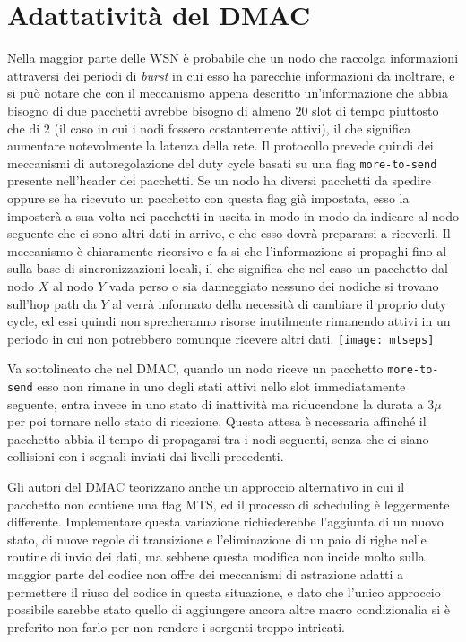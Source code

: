 \documentclass[twoside,11pt,a4paper,italian,openany]{book}
\begin{document}
\section{Adattatività del DMAC}
Nella maggior parte delle WSN è probabile che un nodo che raccolga informazioni attraversi dei
periodi di \emph{burst} in cui esso ha parecchie informazioni da inoltrare, e si può notare che 
con il meccanismo appena descritto un'informazione che abbia bisogno di due pacchetti avrebbe 
bisogno di almeno $20$ slot di tempo piuttosto che di $2$ (il caso in cui i nodi fossero 
costantemente attivi), il che significa aumentare notevolmente la latenza della rete. 
Il protocollo prevede quindi dei meccanismi di autoregolazione del duty cycle basati su una flag 
\texttt{more-to-send} presente nell'header dei pacchetti. 
Se un nodo ha diversi pacchetti da spedire oppure se ha ricevuto un pacchetto con questa flag
già impostata, esso la imposterà a sua volta nei pacchetti in uscita in modo in modo da 
indicare al nodo seguente che ci sono altri dati in arrivo, e che esso dovrà prepararsi a 
riceverli. Il meccanismo è chiaramente ricorsivo e fa si che l'informazione si propaghi fino 
al \sink sulla base di sincronizzazioni locali, il che significa che nel caso un pacchetto dal 
nodo $X$ al nodo $Y$ vada perso o sia danneggiato nessuno dei nodiche si trovano sull'hop path da
$Y$ al \sink verrà informato della necessità di cambiare il proprio duty cycle, ed essi quindi 
non sprecheranno risorse inutilmente rimanendo attivi in un periodo in cui non potrebbero 
comunque ricevere altri dati. 
\texttt{[image: mtseps]}


Va sottolineato che nel DMAC, quando un nodo riceve un pacchetto \texttt{more-to-send} esso non 
rimane in uno degli stati attivi nello slot immediatamente seguente, entra invece in uno stato di
inattività ma riducendone la durata a  
$3\mu$ per poi tornare nello stato di ricezione. Questa attesa è necessaria affinché il 
pacchetto abbia il tempo di propagarsi tra i nodi seguenti, senza che ci siano collisioni con i
segnali inviati dai livelli precedenti. 

Gli autori del DMAC teorizzano anche un approccio alternativo in cui il pacchetto non contiene 
una flag MTS,  ed il processo di scheduling è leggermente differente. 
Implementare questa variazione richiederebbe l'aggiunta di un nuovo stato, di 
nuove regole di transizione e l'eliminazione di un paio di righe nelle routine di invio dei dati,
ma sebbene questa modifica non incide molto sulla maggior parte del codice \nesc non offre dei 
meccanismi di astrazione adatti a permettere il riuso del codice in questa situazione, e dato 
che l'unico approccio possibile sarebbe stato quello di aggiungere ancora altre macro 
condizionalia si è preferito non farlo per non rendere i sorgenti troppo intricati. 
\end{document}

